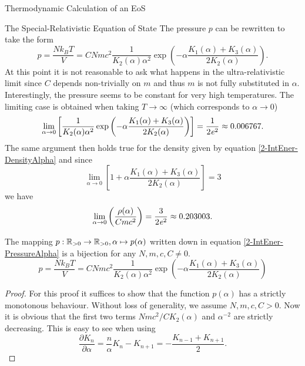 \begin{section}{Thermodynamic Calculation of an EoS}
\begin{subsection}{The Special-Relativistic Equation of State}
The pressure $p$ can be rewritten to take the form
\begin{equation}
	p = \frac{Nk_BT}{V} = CNmc^2\frac{1}{K_2(\alpha)\alpha^2}\exp\left(-\alpha\frac{K_1(\alpha)+K_3(\alpha)}{2K_2(\alpha)}\right).
	\label{2-IntEner-PressureAlpha}
\end{equation}
At this point it is not reasonable to ask what happens in the ultra-relativistic limit since $C$ depends non-trivially on $m$ and thus $m$ is not fully substituted in $\alpha$.\\
Interestingly, the pressure seems to be constant for very high temperatures.
The limiting case is obtained when taking $T\rightarrow\infty$ (which corresponds to $\alpha\rightarrow0$)
\begin{equation}
	\lim\limits_{\alpha\to0}\left[\frac{1}{K_2(\alpha)\alpha^2}\exp\left(-\alpha\frac{K_1(\alpha)+K_3(\alpha)}{2K_2(\alpha)}\right)\right] = \frac{1}{2\mathit{e}^2} \approx 0.006767.
	\label{2-IntEner-PressureAlpha-Limit}
\end{equation}
The same argument then holds true for the density given by equation \eqref{2-IntEner-DensityAlpha} and since 
\begin{equation}
	\lim\limits_{\alpha\to0}\left[1+\alpha\frac{K_1(\alpha)+K_3(\alpha)}{2K_2(\alpha)}\right] = 3
\end{equation}
we have
\begin{equation}
	\lim\limits_{\alpha\to0}\left(\frac{\rho(\alpha)}{Cmc^2}\right) = \frac{3}{2\mathit{e}^2} \approx 0.203003.
\end{equation}
%
%
\begin{theorem}
	The mapping $p:\mathbb{R}_{>0}\rightarrow \mathbb{R}_{>0},\alpha\mapsto p(\alpha)$ written down in equation \eqref{2-IntEner-PressureAlpha} is a bijection for any $N,m,c,C\neq0$.
	\begin{equation}
		p = \frac{Nk_BT}{V} = CNmc^2\frac{1}{K_2(\alpha)\alpha^2}\exp\left(-\alpha\frac{K_1(\alpha)+K_3(\alpha)}{2K_2(\alpha)}\right)
	\end{equation}
\end{theorem}
\begin{proof}
	For this proof it suffices to show that the function $p(\alpha)$ has a strictly monotonous behaviour.
	Without loss of generality, we assume $N,m,c,C>0$.
	Now it is obvious that the first two terms $Nmc^2/CK_2(\alpha)$ and $\alpha^{-2}$ are strictly decreasing.
	This is easy to see when using \cite{abramowitzPocketbookMathematicalFunctions1984}
	\begin{equation}
		\frac{\partial K_n}{\partial\alpha} = \frac{n}{\alpha}K_n-K_{n+1} = -\frac{K_{n-1}+K_{n+1}}{2}.

\end{equation}
\end{proof}
\end{subsection}
\end{section}

